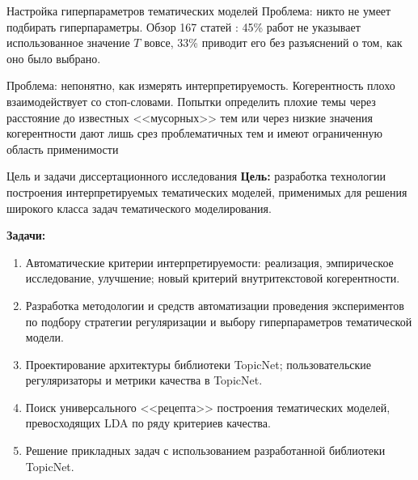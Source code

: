\begin{frame}{Настройка гиперпараметров тематических моделей}
Проблема: никто не умеет подбирать гиперпараметры. Обзор 167 статей \cite{chen2016survey}: 45\% работ не указывает использованное значение $T$ вовсе, 33\% приводит его без разъяснений о том, как оно было выбрано.
\bigskip

Проблема: непонятно, как измерять интерпретируемость. Когерентность плохо взаимодействует со стоп-словами. Попытки определить плохие темы через расстояние до известных <<мусорных>> тем или через низкие значения когерентности дают лишь срез проблематичных тем и имеют ограниченную область применимости

\end{frame}






\begin{frame}[t]{Цель и задачи диссертационного исследования}
\textbf{Цель:} разработка технологии построения интерпретируемых  тематических моделей, применимых для решения широкого класса задач тематического моделирования.

\bigskip
\textbf{Задачи:}
\begin{enumerate}
    \smallskip\item Автоматические критерии интерпретируемости: реализация, эмпирическое исследование, улучшение; новый критерий внутритекстовой когерентности.

    \smallskip\item Разработка методологии и средств автоматизации проведения экспериментов по подбору стратегии регуляризации и выбору гиперпараметров тематической модели.

    \smallskip\item Проектирование архитектуры библиотеки TopicNet; пользовательские регуляризаторы и метрики качества в TopicNet.

    \smallskip\item Поиск универсального <<рецепта>> построения тематических моделей, превосходящих LDA по ряду критериев качества.

    \smallskip\item Решение прикладных задач с использованием разработанной библиотеки TopicNet.

\end{enumerate}
\end{frame}


